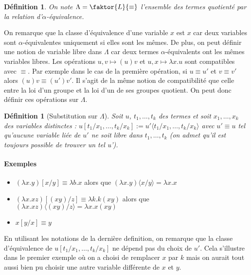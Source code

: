 \documentclass[a4paper,12pt]{article}
\theoremstyle{plain}
\newtheorem{defi}[theo]{Définition}
\begin{document}
\begin{defi}
On note $\Lambda =  \faktor{L}{\equiv}$ l'ensemble des termes quotienté par la relation d'$\alpha$-équivalence.
\end{defi}

On remarque que la classe d'équivalence d'une variable $x$ est ${x}$ car deux variables sont $\alpha$-équivalentes uniquement si elles sont les mêmes. De plus, on peut définir une notion de variable libre dans $\Lambda$ car deux termes $\alpha$-équivalents ont les mêmes variables libres. Les opérations $u,v \mapsto (u)v$ et $u,x \mapsto \lambda x.u$ sont compatibles avec $\equiv$. Par exemple dans le cas de la première opération, si $u \equiv u'$ et $v \equiv v'$ alors $(u)v \equiv (u')v'$. Il s'agit de la même notion de compatibilité que celle entre la loi d'un groupe et la loi d'un de ses groupes quotient. On peut donc définir ces opérations sur $\Lambda$.

\begin{defi}[Substitution sur $\Lambda$]
Soit $u$, $t_1, \dots, t_k$ des termes et soit $x_1, \dots, x_k$ des variables distinctes : $u[t_1/x_1, \dots, t_k/x_k] := u' \langle t_1/x_1, \dots, t_k/x_k \rangle$ avec $u' \equiv u$ tel qu'aucune variable liée de $u'$ ne soit libre dans $t_1, \dots, t_k$ (on admet qu'il est toujours possible de trouver un tel u').
\label{substitution}
\end{defi}

\paragraph{Exemples}
\begin{itemize}
\setlength\itemsep{ -1.5 em}
\item $(\lambda x. y)[x/y] \equiv \lambda b.x$ alors que $(\lambda x. y) \langle x/y \rangle = \lambda x.x$\\
\item $(\lambda x.xz)[(xy)/z] \equiv \lambda k.k(xy)$ alors que $(\lambda x.xz) \langle (xy)/z \rangle = \lambda x.x(xy)$\\
\item $x[y/x] \equiv y$ 
\end{itemize}

En utilisant les notations de la dernière definition, on remarque que la classe d'équivalence de $u[t_1/x_1, \dots, t_k/x_k]$ ne dépend pas du choix de $u'$. Cela s'illustre dans le premier exemple où on a choisi de remplacer $x$ par $k$ mais on aurait tout aussi bien pu choisir une autre variable différente de $x$ et $y$.
\end{document}
